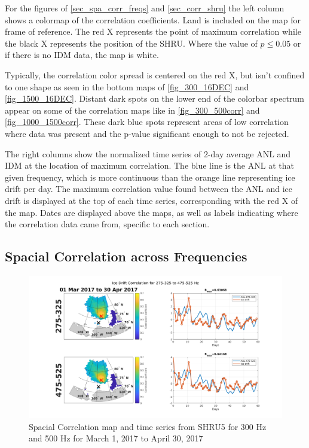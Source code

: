 For the figures of \autoref{sec_spa_corr_freqs} and \autoref{sec_corr_shru}  the left column shows a colormap of the correlation coefficients. Land is included on the map for frame of reference. The red X represents the point of maximum correlation while the black X represents the position of the SHRU. Where the value of $p\leq0.05$ or if there is no IDM data, the map is white. 

Typically, the correlation color spread is centered on the red X, but isn't confined to one shape as seen in the bottom maps of \autoref{fig_300_16DEC} and \autoref{fig_1500_16DEC}. Distant dark spots on the lower end of the colorbar spectrum appear on some of the correlation maps like in \autoref{fig_300_500corr} and \autoref{fig_1000_1500corr}. These dark blue spots represent areas of low correlation where data was present and the p-value significant enough to not be rejected.

The right columns show the normalized time series of 2-day average ANL and IDM at the location of maximum correlation. The blue line is the ANL at that given frequency, which is more continuous than the orange line representing ice drift per day. The maximum correlation value found between the ANL and ice drift is displayed at the top of each time series, corresponding with the red X of the map. Dates are displayed above the maps, as well as labels indicating where the correlation data came from, specific to each section.




\subsection{Spacial Correlation across Frequencies} \label{sec_spa_corr_freqs}

\begin{figure}[p]
\centering
\includegraphics[scale=0.35]{Figures/300_500_spatial_corr_20170301-20170430.png}
\caption{Spacial Correlation map and time series from SHRU5 for 300 Hz and 500 Hz for March 1, 2017 to April 30, 2017}
\label{fig_300_500corr}
\end{figure}


